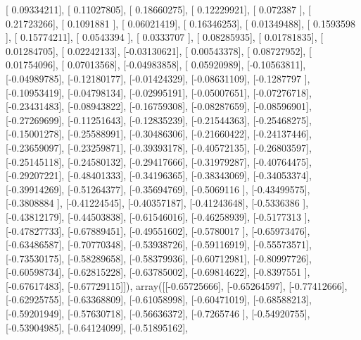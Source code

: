 \documentclass{article}
\begin{document}
       [ 0.09334211],
       [ 0.11027805],
       [ 0.18660275],
       [ 0.12229921],
       [ 0.072387  ],
       [ 0.21723266],
       [ 0.1091881 ],
       [ 0.06021419],
       [ 0.16346253],
       [ 0.01349488],
       [ 0.1593598 ],
       [ 0.15774211],
       [ 0.0543394 ],
       [ 0.0333707 ],
       [ 0.08285935],
       [ 0.01781835],
       [ 0.01284705],
       [ 0.02242133],
       [-0.03130621],
       [ 0.00543378],
       [ 0.08727952],
       [ 0.01754096],
       [ 0.07013568],
       [-0.04983858],
       [ 0.05920989],
       [-0.10563811],
       [-0.04989785],
       [-0.12180177],
       [-0.01424329],
       [-0.08631109],
       [-0.1287797 ],
       [-0.10953419],
       [-0.04798134],
       [-0.02995191],
       [-0.05007651],
       [-0.07276718],
       [-0.23431483],
       [-0.08943822],
       [-0.16759308],
       [-0.08287659],
       [-0.08596901],
       [-0.27269699],
       [-0.11251643],
       [-0.12835239],
       [-0.21544363],
       [-0.25468275],
       [-0.15001278],
       [-0.25588991],
       [-0.30486306],
       [-0.21660422],
       [-0.24137446],
       [-0.23659097],
       [-0.23259871],
       [-0.39393178],
       [-0.40572135],
       [-0.26803597],
       [-0.25145118],
       [-0.24580132],
       [-0.29417666],
       [-0.31979287],
       [-0.40764475],
       [-0.29207221],
       [-0.48401333],
       [-0.34196365],
       [-0.38343069],
       [-0.34053374],
       [-0.39914269],
       [-0.51264377],
       [-0.35694769],
       [-0.5069116 ],
       [-0.43499575],
       [-0.3808884 ],
       [-0.41224545],
       [-0.40357187],
       [-0.41243648],
       [-0.5336386 ],
       [-0.43812179],
       [-0.44503838],
       [-0.61546016],
       [-0.46258939],
       [-0.5177313 ],
       [-0.47827733],
       [-0.67889451],
       [-0.49551602],
       [-0.5780017 ],
       [-0.65973476],
       [-0.63486587],
       [-0.70770348],
       [-0.53938726],
       [-0.59116919],
       [-0.55573571],
       [-0.73530175],
       [-0.58289658],
       [-0.58379936],
       [-0.60712981],
       [-0.80997726],
       [-0.60598734],
       [-0.62815228],
       [-0.63785002],
       [-0.69814622],
       [-0.8397551 ],
       [-0.67617483],
       [-0.67729115]]), array([[-0.65725666],
       [-0.65264597],
       [-0.77412666],
       [-0.62925755],
       [-0.63368809],
       [-0.61058998],
       [-0.60471019],
       [-0.68588213],
       [-0.59201949],
       [-0.57630718],
       [-0.56636372],
       [-0.7265746 ],
       [-0.54920755],
       [-0.53904985],
       [-0.64124099],
       [-0.51895162],
\end{document}

